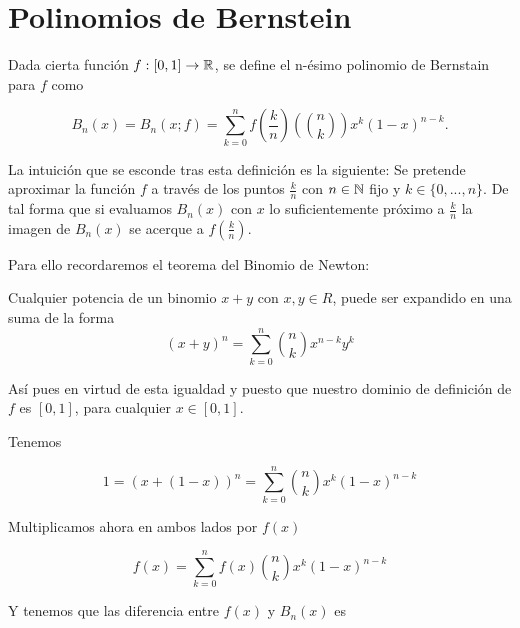 %

\chapter{Polinomios de Bernstein}\label{ch:Bernstein}

\begin{definicion} \label{def:Bernstein}
    Dada cierta función $f: [0,1] \rightarrow \mathbb{R}$, se define el n-ésimo polinomio de Bernstain para $f$ como 

    $$B_n(x) = B_n(x;f)=\sum_ {k=0}^{n} f \left( \frac{k}{n} \right) \left( \binom{n}{k} \right) x^k (1-x)^{n-k}.$$

\end{definicion}

La intuición que se esconde tras esta definición es la siguiente: 
Se pretende aproximar la función $f$ a través de los puntos $\frac{k}{n}$ con $n \in \mathbb{N}$ fijo
y $k \in \{0,...,n \}.$
De tal forma que si evaluamos $B_n(x)$ con $x$ lo suficientemente próximo a  $\frac{k}{n}$  
la imagen de $B_n(x)$ se acerque a $f \left( \frac{k}{n} \right).$

Para ello recordaremos el teorema del Binomio de Newton: 

\begin{teorema}
    Cualquier potencia de un binomio $x+y$ con $x,y \in R$,  puede ser expandido en una suma de la forma
    \[(x+y)^n = \sum_{k=0}^n \binom{n}{k} x^{n-k}y^k\]
\end{teorema}

Así pues en virtud de esta igualdad y puesto que nuestro dominio de definición de $f$ es $[0,1]$, para cualquier $x \in [0,1].$

Tenemos 

\begin{equation}
    1 = (x+ (1-x))^n = \sum_{k=0}^n \binom{n}{k} x^{k} (1-x)^{n-k}
\end{equation}

Multiplicamos ahora en ambos lados por $f(x)$

\begin{equation}
    f(x) = \sum_{k=0}^n f(x) \binom{n}{k} x^{k} (1-x)^{n-k}
\end{equation} 

Y tenemos que las diferencia entre $f(x)$ y $B_n(x)$ es

